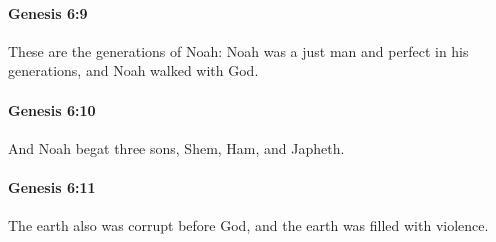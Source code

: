		\paragraph{Genesis 6:9} %
			\label{GENESIS-6-9}

			These are the generations of Noah: Noah was a just man and perfect in his generations, and Noah walked with God.


		\paragraph{Genesis 6:10} %
			\label{GENESIS-6-10}

			And Noah begat three sons, Shem, Ham, and Japheth.


		\paragraph{Genesis 6:11} %
			\label{GENESIS-6-11}

			The earth also was corrupt before God, and the earth was filled with violence.


